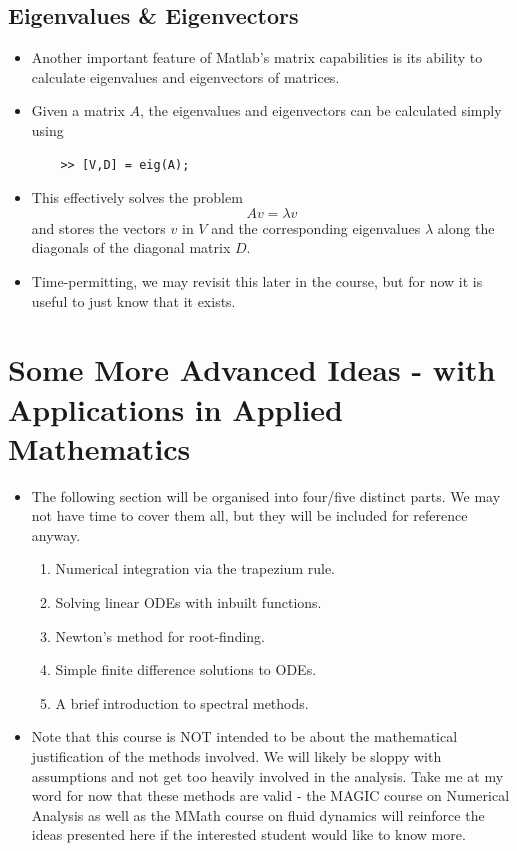 \documentclass[12pt]{report}
\begin{document}
\subsection*{Eigenvalues \& Eigenvectors}

\begin{itemize}
	\item Another important feature of Matlab's matrix capabilities is its ability to calculate eigenvalues and eigenvectors of matrices.
	\item Given a matrix $A$, the eigenvalues and eigenvectors can be calculated simply using
	\begin{lstlisting}
	>> [V,D] = eig(A);
	\end{lstlisting}
	\item This effectively solves the problem
	\begin{displaymath}
	Av = \lambda v
	\end{displaymath}
	and stores the vectors $v$ in $V$ and the corresponding eigenvalues $\lambda$ along the diagonals of the diagonal matrix $D$.
	\item Time-permitting, we may revisit this later in the course, but for now it is useful to just know that it exists.
\end{itemize}


\section*{Some More Advanced Ideas - with Applications in Applied Mathematics}

\begin{itemize}
	\item The following section will be organised into four/five distinct parts. We may not have time to cover them all, but they will be included for reference anyway.
	\begin{enumerate}
		\item Numerical integration via the trapezium rule.
		\item Solving linear ODEs with inbuilt functions.
		\item Newton's method for root-finding.
		\item Simple finite difference solutions to ODEs.
		\item A brief introduction to spectral methods.
	\end{enumerate}
	\item Note that this course is NOT intended to be about the mathematical justification of the methods involved. We will likely be sloppy with assumptions and not get too heavily involved in the analysis. Take me at my word for now that these methods are valid - the MAGIC course on Numerical Analysis as well as the MMath course on fluid dynamics will reinforce the ideas presented here if the interested student would like to know more.
\end{itemize}
\end{document}
